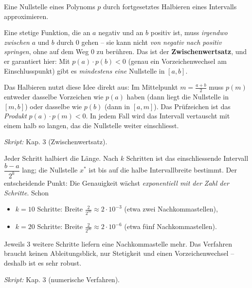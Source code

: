 

Eine Nullstelle eines Polynoms $p$ durch fortgesetztes Halbieren eines
Intervalls approximieren.

\begin{werkzeugkasten}
Eine stetige Funktion, die an $a$ negativ und an $b$ positiv ist, muss
\emph{irgendwo zwischen} $a$ und $b$ durch $0$ gehen -- sie kann nicht
\emph{von negativ nach positiv springen}, ohne auf dem Weg $0$ zu berühren.
Das ist der \textbf{Zwischenwertsatz}, und er garantiert hier: Mit
$p(a)\cdot p(b)<0$ (genau ein Vorzeichenwechsel am Einschlusspunkt) gibt es
\emph{mindestens eine} Nullstelle in $[a,b]$.

Das Halbieren nutzt diese Idee direkt aus: Im Mittelpunkt $m=\frac{a+b}{2}$
muss $p(m)$ entweder dasselbe Vorzeichen wie $p(a)$ haben (dann liegt die
Nullstelle in $[m,b]$) oder dasselbe wie $p(b)$ (dann in $[a,m]$). Das
Prüfzeichen ist das \emph{Produkt} $p(a)\cdot p(m)<0$. In jedem Fall wird
das Intervall vertauscht mit einem halb so langen, das die Nullstelle weiter
einschliesst.

\textit{Skript:} Kap. 3 (Zwischenwertsatz).
\end{werkzeugkasten}

\begin{werkzeugkasten}
Jeder Schritt halbiert die Länge. Nach $k$ Schritten ist das einschliessende
Intervall $\dfrac{b-a}{2^k}$ lang; die Nullstelle $x^*$ ist bis auf die
halbe Intervallbreite bestimmt. Der entscheidende Punkt: Die Genauigkeit
wächst \emph{exponentiell mit der Zahl der Schritte}. Schon
\begin{itemize}
  \item $k=10$ Schritte: Breite $\tfrac{2}{2^{10}}\approx2\cdot10^{-3}$
        (etwa zwei Nachkommastellen),
  \item $k=20$ Schritte: Breite $\tfrac{2}{2^{20}}\approx2\cdot10^{-6}$
        (etwa fünf Nachkommastellen).
\end{itemize}
Jeweils 3 weitere Schritte liefern eine Nachkommastelle mehr. Das
Verfahren braucht keinen Ableitungsblick, nur Stetigkeit und einen
Vorzeichenwechsel -- deshalb ist es sehr robust.

\textit{Skript:} Kap. 3 (numerische Verfahren).
\end{werkzeugkasten}

